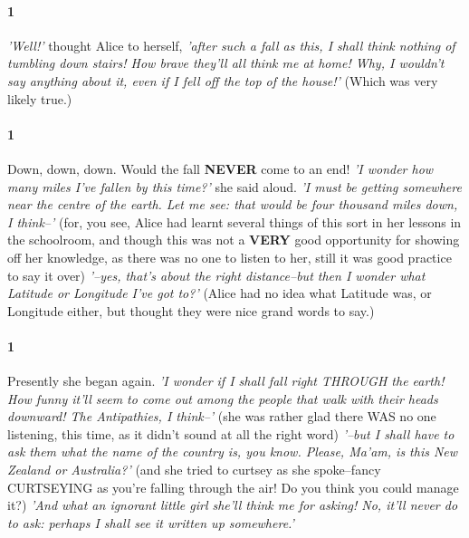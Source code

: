 \documentclass[12pt]{article}
\begin{document}
\paragraph{1} \textit{'Well!'} thought Alice to herself, \textit{'after such a fall as this, I shall
think nothing of tumbling down stairs! How brave they'll all think me at
home! Why, I wouldn't say anything about it, even if I fell off the top
of the house!'} (Which was very likely true.)


\paragraph{1} Down, down, down. Would the fall \textbf{NEVER} come to an end! \textit{'I wonder how
    many miles I've fallen by this time?'} she said aloud. \textit{'I must be getting
somewhere near the centre of the earth. Let me see: that would be four
thousand miles down, I think--'} (for, you see, Alice had learnt several
things of this sort in her lessons in the schoolroom, and though this
was not a \textbf{VERY} good opportunity for showing off her knowledge, as there
was no one to listen to her, still it was good practice to say it over)
\textit{'--yes, that's about the right distance--but then I wonder what Latitude
    or Longitude I've got to?'} (Alice had no idea what Latitude was, or
Longitude either, but thought they were nice grand words to say.)


\paragraph{1} Presently she began again. \textit{'I wonder if I shall fall right THROUGH the
earth! How funny it'll seem to come out among the people that walk with
their heads downward! The Antipathies, I think--'} (she was rather glad
there WAS no one listening, this time, as it didn't sound at all the
right word) \textit{'--but I shall have to ask them what the name of the country
    is, you know. Please, Ma'am, is this New Zealand or Australia?'} (and
she tried to curtsey as she spoke--\textmd{fancy CURTSEYING as you're falling
    through the air!} Do you think you could manage it?) \textit{'And what an
ignorant little girl she'll think me for asking! No, it'll never do to
ask: perhaps I shall see it written up somewhere.'}
\end{document}
